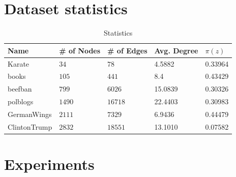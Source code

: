 \section{Dataset statistics}
\label{sec:stats}

\begin{table}[H]
 \centering
 \caption{Statistics}
 \label{tab:statistics}
 \begin{tabular}{| l || l | l | l | l |}
 \hline
  Name & \# of Nodes & \# of Edges & Avg. Degree & $\pi(z)$\\
  \hline
  \hline
  Karate & $34$ & $78$ & 4.5882 &  0.33964\\
  \hline
    books & $105$ & $441$ & 8.4 &  0.43429\\
  \hline
    beefban & $799$ & $6026$ & 15.0839 &  0.30326\\
  \hline
  polblogs & $1490$ & $16718$ & 22.4403 &  0.30983\\
  \hline
  GermanWings & $2111$ & $7329$ & 6.9436 &  0.44479\\
  \hline
  ClintonTrump & $2832$ & $18551$ & 13.1010 &  0.07582\\
  \hline
 \end{tabular}
 \end{table}
 
\vspace{20pt}
\clearpage

\section{Experiments}
\label{sec:experim}

